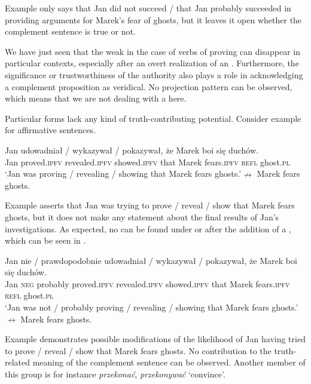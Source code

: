 \documentclass[output=paper,  modfonts,  newtxmath,  hidelinks		  ]{langscibook}
\begin{document}
\noindent Example  only says that Jan did not succeed / that Jan probably succeeded in providing arguments for Marek’s fear of ghosts, but it leaves it open whether the complement sentence is true or not.

We have just seen that the weak  in the case of  verbs of proving can disappear in particular contexts, especially after an overt realization of an . Furthermore, the significance or trustworthiness of the authority also plays a role in acknowledging a complement proposition as veridical. No projection pattern can be observed, which means that we are not dealing with a  here.

Particular  forms lack any kind of truth-contributing potential. Consider example  for affirmative sentences.

\ea\label{21:20}
\gll Jan udowadniał / wykazywał / pokazywał, że Marek boi się duchów.\\
Jan proved.\textsc{ipfv} {} revealed.\textsc{ipfv} {} showed.\textsc{ipfv} that Marek fears.\textsc{ipfv} \textsc{refl} ghost.\textsc{pl}\\
\glt	`Jan was proving / revealing / showing that Marek fears ghosts.'\newline$\nrightarrow$  Marek fears ghosts.
\z

\noindent Example  asserts that Jan was trying to prove / reveal / show that Marek fears ghosts, but it does not make any statement about the final results of Jan’s investigations. As expected, no  can be found under  or after the addition of a , which can be seen in .

\ea\label{21:21}
\gll Jan nie / prawdopodobnie udowadniał / wykazywał / pokazywał, że Marek boi się duchów.\\
Jan \textsc{neg} {} probably proved.\textsc{ipfv} {} revealed.\textsc{ipfv} {} showed.\textsc{ipfv} that Marek fears.\textsc{ipfv} \textsc{refl} ghost.\textsc{pl}\\
\glt	`Jan was not / probably proving / revealing / showing that Marek fears ghosts.'\newline$\nrightarrow$  Marek fears ghosts.
\z

\noindent Example  demonstrates possible modifications of the likelihood of Jan having tried to prove / reveal / show that Marek fears ghosts. No contribution to the truth-related meaning of the complement sentence can be observed. Another member of this group is for instance \textit{przekonać}, \textit{przekonywać} `convince’.
\end{document}
